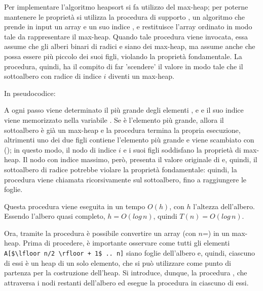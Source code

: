Per implementare l'algoritmo heapsort si fa utilizzo del max-heap; per poterne mantenere le proprietà si utilizza la procedura di supporto , un algoritmo che prende in input un array  e un suo indice , e restituisce l'array ordinato in modo tale da rappresentare il max-heap. Quando tale procedura viene invocata, essa assume che gli alberi binari di radici  e  siano dei max-heap, ma assume anche che  possa essere più piccolo dei suoi figli, violando la proprietà fondamentale. La procedura, quindi, ha il compito di far 'scendere' il valore  in modo tale che il sottoalbero con radice di indice \(i\) diventi un max-heap.

\vspace{1in}

In pseudocodice:

 
A ogni passo viene determinato il più grande degli elementi ,  e  e il suo indice viene memorizzato nella variabile . Se  è l'elemento più grande, allora il sottoalbero è già un max-heap e la procedura termina la propria esecuzione, altrimenti uno dei due figli contiene l'elemento più grande e  viene scambiato con  (); in questo modo, il nodo di indice \(i\) e i suoi figli soddisfano la proprietà di max-heap. Il nodo con indice massimo, però, presenta il valore originale di  e, quindi, il sottoalbero di radice  potrebbe violare la proprietà fondamentale: quindi, la procedura viene chiamata ricorsivamente sul sottoalbero, fino a raggiungere le foglie.

Questa procedura viene eseguita in un tempo \(O(h)\), con \(h\) l'altezza dell'albero. Essendo l'albero quasi completo, \(h=O(log\,n)\), quindi \(T(n)=O(log\,n)\).

\vspace*{10pt}

Ora, tramite la procedura  è possibile convertire un array  (con \(n\)=) in un max-heap. Prima di procedere, è importante osservare come tutti gli elementi \lstinline[mathescape]{A[$\lfloor n/2 \rfloor + 1$ .. n]} siano foglie dell'albero e, quindi, ciascuno di essi è un heap di un solo elemento, che si può utilizzare come punto di partenza per la costruzione dell'heap. Si introduce, dunque, la procedura , che attraversa i nodi restanti dell'albero ed esegue la procedura  in ciascuno di essi. 

